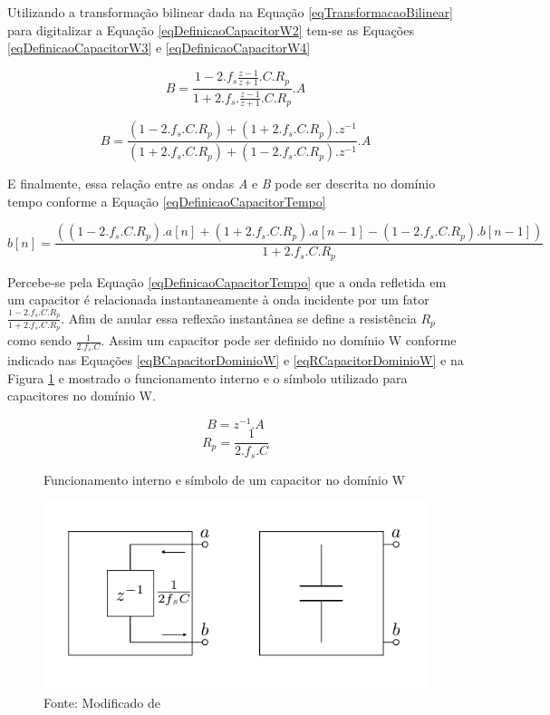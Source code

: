 	Utilizando a transformação bilinear dada na Equação \ref{eqTransformacaoBilinear} para digitalizar a Equação \ref{eqDefinicaoCapacitorW2} tem-se as Equações \ref{eqDefinicaoCapacitorW3} e \ref{eqDefinicaoCapacitorW4}
	
	
	\begin{equation}
		\label{eqDefinicaoCapacitorW3}
		B = \frac{1-2.f_s\frac{z-1}{z+1}.C.R_p}{1+2.f_s.\frac{z-1}{z+1}.C.R_p}.A
	\end{equation} 
	
	\begin{equation}
		\label{eqDefinicaoCapacitorW4}
		B = \frac{(1-2.f_s.C.R_p)+(1+2.f_s.C.R_p).z^{-1}}{(1+2.f_s.C.R_p)+(1-2.f_s.C.R_p).z^{-1}}.A
	\end{equation}
	
	E finalmente, essa relação entre as ondas \textit{A} e \textit{B} pode ser descrita no domínio tempo conforme a Equação \ref{eqDefinicaoCapacitorTempo}
	
	\begin{equation}
		\label{eqDefinicaoCapacitorTempo}
		b[n] = \frac{((1-2.f_s.C.R_p).a[n]+(1+2.f_s.C.R_p).a[n-1]-(1-2.f_s.C.R_p).b[n-1])}{1+2.f_s.C.R_p}	\end{equation}
	
	Percebe-se pela Equação \ref{eqDefinicaoCapacitorTempo} que a onda refletida em um capacitor é relacionada instantaneamente à onda incidente por um fator $\frac{1-2.f_s.C.R_p}{1+2.f_s.C.R_p}$. Afim de anular essa reflexão instantânea se define a resistência $R_p$ como sendo $\frac{1}{2.f_s.C}$. Assim um capacitor pode ser definido no domínio W conforme indicado nas Equações \ref{eqBCapacitorDominioW} e \ref{eqRCapacitorDominioW} e na Figura \ref{figCapacitorDominioW} e mostrado o funcionamento interno e o símbolo utilizado para capacitores no domínio W.
	
	\begin{equation}
	\label{eqBCapacitorDominioW}
		B = z^{-1}.A
	\end{equation}
	\begin{equation}
	\label{eqRCapacitorDominioW}
		R_p = \frac{1}{2.f_s.C}
	\end{equation}
	
	\begin{figure}[h]
		\label{figCapacitorDominioW}
		\caption{Funcionamento interno e símbolo de um capacitor no domínio W}
		\includegraphics[scale=0.5]{images/capacitor}
		\centering
		\caption*{Fonte: Modificado de \cite{Bogason2017}}
	\end{figure}
	
